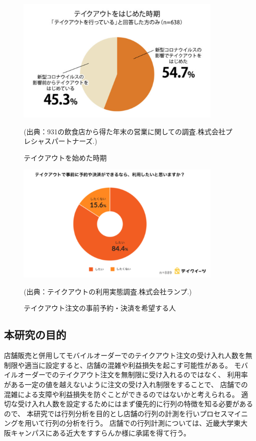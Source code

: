 \documentclass{jsarticle}
\begin{document}
\begin{figure}[H]
  \centering
  \includegraphics[width=10cm]{2.png}
  \caption{テイクアウトを始めた時期}
  \scriptsize(出典：931の飲食店から得た年末の営業に関しての調査.株式会社プレシャスパートナーズ.)
  \label{fig:2}
\end{figure}

\begin{figure}[H]
  \centering
  \includegraphics[width=10cm]{6.png}
  \caption{テイクアウト注文の事前予約・決済を希望する人}
  \scriptsize(出典：テイクアウトの利用実態調査.株式会社ランプ.)
  \label{fig:6}
\end{figure}








\newpage
\subsection{本研究の目的}
店舗販売と併用してモバイルオーダーでのテイクアウト注文の受け入れ人数を無制限や適当に設定すると、店舗の混雑や利益損失を起こす可能性がある。
モバイルオーダーでのテイクアウト注文を無制限に受け入れるのではなく、
利用率がある一定の値を越えないように注文の受け入れ制限をすることで、
店舗での混雑による支障や利益損失を防ぐことができるのではないかと考えられる。
適切な受け入れ人数を設定するためにはまず優先的に行列の特徴を知る必要があるので、
本研究では行列分析を目的とし店舗の行列の計測を行いプロセスマイニングを用いて行列の分析を行う。
店舗での行列計測については、近畿大学東大阪キャンパスにある近大をすすらんか様に承諾を得て行う。
\end{document}
